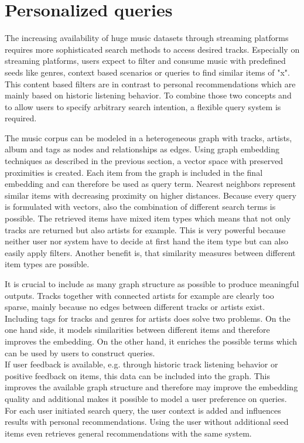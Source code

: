 \documentclass[sigconf]{acmart}
\begin{document}
\section{Personalized queries}
The increasing availability of huge music datasets through streaming platforms requires more sophisticated search methods to access desired tracks. Especially on streaming platforms, users expect to filter and consume music with predefined seeds like genres, context based scenarios or queries to find similar items of "x". This content based filters are in contrast to personal recommendations which are mainly based on historic listening behavior. To combine those two concepts and to allow users to specify arbitrary search intention, a flexible query system is required.

The music corpus can be modeled in a heterogeneous graph with tracks, artists, album and tags as nodes and relationships as edges. Using graph embedding techniques as described in the previous section, a vector space with preserved proximities is created. Each item from the graph is included in the final embedding and can therefore be used as query term. Nearest neighbors represent similar items with decreasing proximity on higher distances. Because every query is formulated with vectors, also the combination of different search terms is possible. The retrieved items have mixed item types which means that not only tracks are returned but also artists for example. This is very powerful because neither user nor system have to decide at first hand the item type but can also easily apply filters. Another benefit is, that similarity measures between different item types are possible.

It is crucial to include as many graph structure as possible to produce meaningful outputs. Tracks together with connected artists for example are clearly too sparse, mainly because no edges between different tracks or artists exist. Including tags for tracks and genres for artists does solve two problems. On the one hand side, it models similarities between different items and therefore improves the embedding. On the other hand, it enriches the possible terms which can be used by users to construct queries. \\

If user feedback is available, e.g. through historic track listening behavior or positive feedback on items, this data can be included into the graph. This improves the available graph structure and therefore may improve the embedding quality and additional makes it possible to model a user preference on queries. For each user initiated search query, the user context is added and influences results with personal recommendations. Using the user without additional seed items even retrieves general recommendations with the same system.
\end{document}
